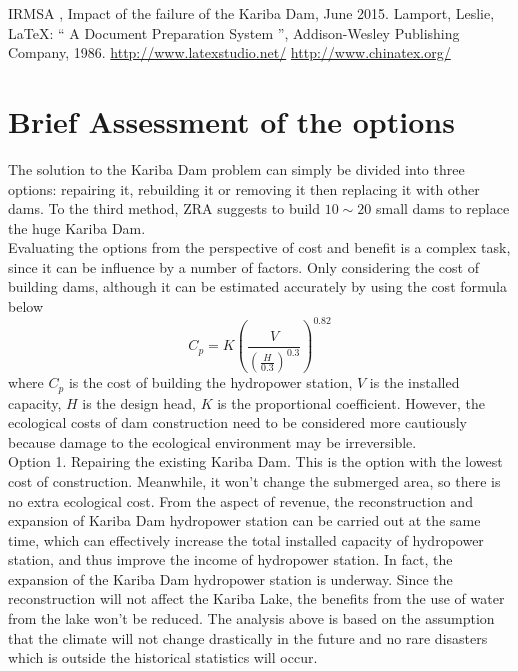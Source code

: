 \documentclass{mcmthesis}
\begin{document}
\begin{thebibliography}{99}
 IRMSA , Impact of the failure of the Kariba Dam, June 2015.
Lamport, Leslie,  \LaTeX{}: `` A Document Preparation System '',
Addison-Wesley Publishing Company, 1986.
\url{http://www.latexstudio.net/}
\url{http://www.chinatex.org/}
\end{thebibliography}

\clearpage
\section{Brief Assessment of the options}
\indent \indent The solution to the Kariba Dam problem can simply be divided into three options: repairing it, rebuilding it or removing it then replacing it with other dams. To the third method, ZRA suggests to build $10\sim20$ small dams to replace the huge Kariba Dam.\\
\indent Evaluating the options from the perspective of cost and benefit is a complex task, since it can be influence by a number of factors. Only considering the cost of building dams, although it can be estimated accurately by using the cost formula below \\
\[
C_{p} = K\left(\frac{V}{\left(\frac{H}{0.3}\right)^{0.3}}\right)^{0.82}
\]
where $C_{p}$ is the cost of building the hydropower station, $V$ is the installed capacity, $H$ is the design head, $K$ is the proportional coefficient. However, the ecological costs of dam construction need to be considered more cautiously because damage to the ecological environment may be irreversible.\\
\indent Option 1. Repairing the existing Kariba Dam. This is the option with the lowest cost of construction. Meanwhile, it won't change the submerged area, so there is no extra ecological cost. From the aspect of revenue, the reconstruction and expansion of Kariba Dam hydropower station can be carried out at the same time, which can effectively increase the total installed capacity of hydropower station, and thus improve the income of hydropower station. In fact, the expansion of the Kariba Dam hydropower station is underway. Since the reconstruction will not affect the Kariba Lake, the benefits from the use of water from the lake won't be reduced. The analysis above is based on the assumption that the climate will not change drastically in the future and no rare disasters which is outside the historical statistics will occur.\\
\end{document}
